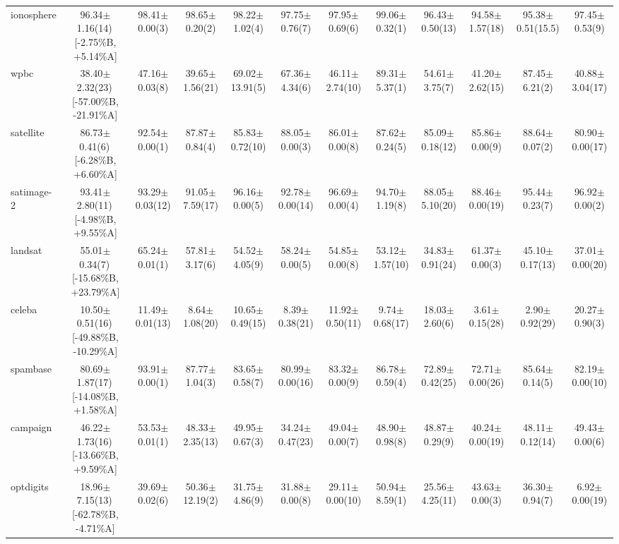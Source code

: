 \documentclass[conference]{IEEEtran}
\begin{document}
\begin{table}
{\begin{tabular}{lccccccccccc}
				ionosphere & 96.34$\pm$1.16(14)\,[{-}2.75\%B, {+}5.14\%A] & 98.41$\pm$0.00(3) & 98.65$\pm$0.20(2) & 98.22$\pm$1.02(4) & 97.75$\pm$0.76(7) & 97.95$\pm$0.69(6) & 99.06$\pm$0.32(1) & 96.43$\pm$0.50(13) & 94.58$\pm$1.57(18) & 95.38$\pm$0.51(15.5) & 97.45$\pm$0.53(9) \\
				wpbc & 38.40$\pm$2.32(23)\,[{-}57.00\%B, {-}21.91\%A] & 47.16$\pm$0.03(8) & 39.65$\pm$1.56(21) & 69.02$\pm$13.91(5) & 67.36$\pm$4.34(6) & 46.11$\pm$2.74(10) & 89.31$\pm$5.37(1) & 54.61$\pm$3.75(7) & 41.20$\pm$2.62(15) & 87.45$\pm$6.21(2) & 40.88$\pm$3.04(17) \\
				satellite & 86.73$\pm$0.41(6)\,[{-}6.28\%B, {+}6.60\%A] & 92.54$\pm$0.00(1) & 87.87$\pm$0.84(4) & 85.83$\pm$0.72(10) & 88.05$\pm$0.00(3) & 86.01$\pm$0.00(8) & 87.62$\pm$0.24(5) & 85.09$\pm$0.18(12) & 85.86$\pm$0.00(9) & 88.64$\pm$0.07(2) & 80.90$\pm$0.00(17) \\
				satimage-2 & 93.41$\pm$2.80(11)\,[{-}4.98\%B, {+}9.55\%A] & 93.29$\pm$0.03(12) & 91.05$\pm$7.59(17) & 96.16$\pm$0.00(5) & 92.78$\pm$0.00(14) & 96.69$\pm$0.00(4) & 94.70$\pm$1.19(8) & 88.05$\pm$5.10(20) & 88.46$\pm$0.00(19) & 95.44$\pm$0.23(7) & 96.92$\pm$0.00(2) \\
				landsat & 55.01$\pm$0.34(7)\,[{-}15.68\%B, {+}23.79\%A] & 65.24$\pm$0.01(1) & 57.81$\pm$3.17(6) & 54.52$\pm$4.05(9) & 58.24$\pm$0.00(5) & 54.85$\pm$0.00(8) & 53.12$\pm$1.57(10) & 34.83$\pm$0.91(24) & 61.37$\pm$0.00(3) & 45.10$\pm$0.17(13) & 37.01$\pm$0.00(20) \\
				celeba & 10.50$\pm$0.51(16)\,[{-}49.88\%B, {-}10.29\%A] & 11.49$\pm$0.01(13) & 8.64$\pm$1.08(20) & 10.65$\pm$0.49(15) & 8.39$\pm$0.38(21) & 11.92$\pm$0.50(11) & 9.74$\pm$0.68(17) & 18.03$\pm$2.60(6) & 3.61$\pm$0.15(28) & 2.90$\pm$0.92(29) & 20.27$\pm$0.90(3) \\
				spambase & 80.69$\pm$1.87(17)\,[{-}14.08\%B, {+}1.58\%A] & 93.91$\pm$0.00(1) & 87.77$\pm$1.04(3) & 83.65$\pm$0.58(7) & 80.99$\pm$0.00(16) & 83.32$\pm$0.00(9) & 86.78$\pm$0.59(4) & 72.89$\pm$0.42(25) & 72.71$\pm$0.00(26) & 85.64$\pm$0.14(5) & 82.19$\pm$0.00(10) \\
				campaign & 46.22$\pm$1.73(16)\,[{-}13.66\%B, {+}9.59\%A] & 53.53$\pm$0.01(1) & 48.33$\pm$2.35(13) & 49.95$\pm$0.67(3) & 34.24$\pm$0.47(23) & 49.04$\pm$0.00(7) & 48.90$\pm$0.98(8) & 48.87$\pm$0.29(9) & 40.24$\pm$0.00(19) & 48.11$\pm$0.12(14) & 49.43$\pm$0.00(6) \\
				optdigits & 18.96$\pm$7.15(13)\,[{-}62.78\%B, {-}4.71\%A] & 39.69$\pm$0.02(6) & 50.36$\pm$12.19(2) & 31.75$\pm$4.86(9) & 31.88$\pm$0.00(8) & 29.11$\pm$0.00(10) & 50.94$\pm$8.59(1) & 25.56$\pm$4.25(11) & 43.63$\pm$0.00(3) & 36.30$\pm$0.94(7) & 6.92$\pm$0.00(19) \\

\end{tabular}}
\end{table}
\end{document}
